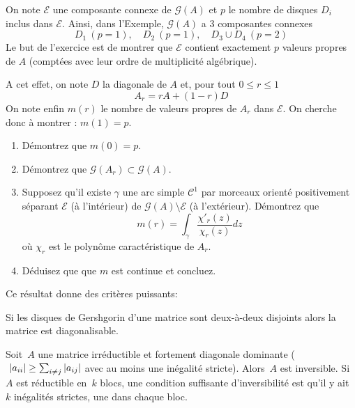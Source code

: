 \begin{exercice}
\label{ex:gersh} On note $\mathcal E$ une composante connexe de $\mathcal G(A)$ et $p$ le nombre de disques $D_i$ inclus dans $\mathcal E$. Ainsi, dans l'Exemple, $\mathcal G(A)$ a 3 composantes connexes
\begin{displaymath}
D_1 \ (p = 1),\quad D_2 \ (p = 1), \quad D_3 \cup D_4 \ (p= 2)
\end{displaymath}
Le but de l'exercice est de montrer que $\mathcal E$ contient exactement $p$
valeurs propres de $A$ (comptées avec leur ordre de multiplicité algébrique). 

A cet effet, on note $D$ la diagonale de $A$ et, pour tout $0 \leq r \leq 1$
\begin{displaymath}
A_r = rA + (1-r)D
\end{displaymath}
On note enfin $m(r)$ le nombre de valeurs propres de $A_r$ dans $\mathcal E$.
On cherche donc à montrer : $m(1) = p$.
\begin{enumerate}
\item Démontrez que $m(0) = p$.
\item Démontrez que $\mathcal G(A_r) \subset \mathcal G(A)$.
\item {Supposez qu'il existe} $\gamma$ une arc simple $\mathcal C^1$ par
	morceaux orienté positivement séparant $\mathcal E$ (à l'intérieur) de
	$\mathcal G(A) \setminus \mathcal E$ (à l'extérieur). Démontrez que
\begin{displaymath}
m(r) = \int_{\gamma} \frac{\chi'_{r}(z)}{\chi_{r}(z)}dz
\end{displaymath}
où $\chi_{r}$ est le polynôme caractéristique de $A_r$.
\item Déduisez que que $m$ est continue et concluez.
\end{enumerate}
\end{exercice}

Ce résultat donne des critères puissants:

\begin{corollary}
	Si les disques de Gershgorin d'une matrice sont deux-à-deux disjoints alors
	la matrice est diagonalisable.
\end{corollary}

\begin{proposition}
	Soit~$A$ une matrice irréductible et fortement diagonale dominante
	($\ \left|a_{ii}\right|\ge\sum_{i\neq j}\left|a_{ij}\right|$ avec au moins une inégalité
	stricte).  Alors~$A$ est inversible.  Si~$A$ est réductible en~$k$ blocs,
	une condition suffisante d'inversibilité est qu'il y ait~$k$ inégalités
	strictes, une dans chaque bloc.
\end{proposition}

